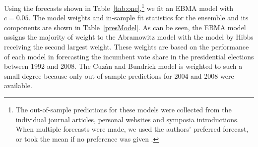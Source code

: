 \documentclass[12pt,fullpage,endnotes]{article}
\begin{document}
Using the forecasts shown in Table~\ref{tab:one},\footnote{The
  out-of-sample predictions for these models were collected from the
  individual journal articles, personal websites and symposia
  introductions. When multiple forecasts were made, we used the
  authors' preferred forecast, or took the mean if no preference was
  given
  \citep{Hibbs:1992,Holbrook:1996,LewisBeckTien:1996,EriksonWlezien:1996,Abramowitz:2000,Hibbs:2000,CampbellGarand:2000,Campbell:2000,Campbell:2001,Hibbs:2004,Campbell:2004,Campbell:2005,Campbell:2008a,Abramowitz:2012,Campbell:2012,Cuzan:2012,EriksonWlezien:2012,Fair:2012,Hibbs:2012a,Holbrook:2012,LewisBeckTien:2012,Lockerbie:2012}.}
we fit an EBMA model with $c=0.05$.  The model weights and in-sample
fit statistics for the ensemble and its components are shown in
Table~\ref{presModel}.  As can be seen, the EBMA model assigns the
majority of weight to the Abramowitz model with the model by Hibbs
receiving the second largest weight. These weights are based on the
performance of each model in forecasting the incumbent vote share in
the presidential elections between 1992 and 2008. The Cuz\`an and
Bundrick model is weighted to such a small degree because only
out-of-sample predictions for 2004 and 2008 were available.
\end{document}

